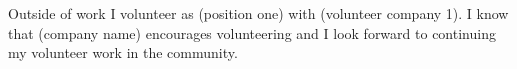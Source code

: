 Outside of work I volunteer as (position one) with (volunteer company 1). I know that (company name) encourages volunteering and I look forward to continuing my volunteer work in the community.